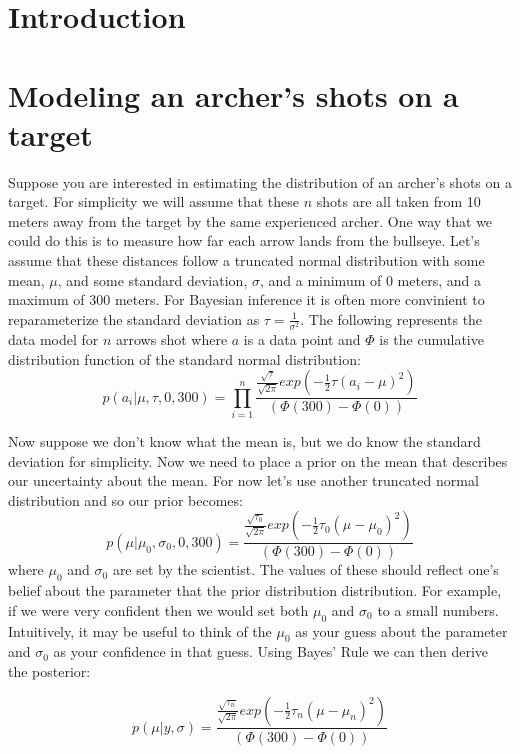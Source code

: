 \bigskip
\section{Introduction}\label{sect:Introduction}




\newpage
\section{Modeling an archer's shots on a target}\label{sect:Exercise}

Suppose you are interested in estimating the distribution of an archer's shots on a target. For simplicity we will assume that these $n$ shots are all taken from 10 meters away from the target by the same experienced archer. One way that we could do this is to measure how far each arrow lands from the bullseye. Let's assume that these distances follow a truncated normal distribution with some mean, $\mu$, and some standard deviation, $\sigma$, and a minimum of $0$ meters, and a maximum of $300$ meters. For Bayesian inference it is often more convinient to reparameterize the standard deviation as $\tau = \frac{1}{\sigma^2}$. The following represents the data model for $n$ arrows shot where $a$ is a data point and $\Phi$ is the cumulative distribution function of the standard normal distribution:
\[ p(a_i | \mu, \tau, 0, 300) = \prod_{i=1}^{n} \frac{\frac{\sqrt{\tau}}{\sqrt{2\pi}} exp\left(-\frac{1}{2}\tau(a_i - \mu)^2\right)}{(\Phi(300) - \Phi(0))} \]

Now suppose we don't know what the mean is, but we do know the standard deviation for simplicity. Now we need to place a prior on the mean that describes our uncertainty about the mean. For now let's use another truncated normal distribution and so our prior becomes:
\[ p(\mu | \mu_0, \sigma_0, 0, 300) = \frac{\frac{\sqrt{\tau_0}}{\sqrt{2\pi}}exp\left(-\frac{1}{2}\tau_0(\mu - \mu_0)^2\right)}{(\Phi(300) - \Phi(0))} \]
where $\mu_0$ and $\sigma_0$ are set by the scientist. The values of these should reflect one's belief about the parameter that the prior distribution distribution. For example, if we were very confident then we would set both $\mu_0$ and $\sigma_0$ to a small numbers. Intuitively, it may be useful to think of the $\mu_0$ as your guess about the parameter and $\sigma_0$ as your confidence in that guess. Using Bayes' Rule we can then derive the posterior: 

\[ p(\mu | y, \sigma) = \frac{\frac{\sqrt{\tau_n}}{\sqrt{2\pi}}exp\left(-\frac{1}{2}\tau_n(\mu - \mu_n)^2\right)}{ (\Phi(300) - \Phi(0))} \]

